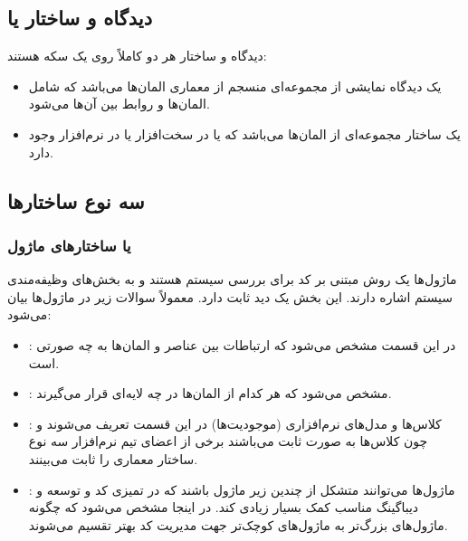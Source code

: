 \subsection{دیدگاه و ساختار یا }

دیدگاه و ساختار هر دو کاملاً روی یک سکه هستند:

\begin{itemize}
    \item یک دیدگاه نمایشی از مجموعه‌ای منسجم از معماری المان‌ها می‌باشد که شامل
    المان‌ها و روابط بین آن‌ها می‌شود.
    \item یک ساختار مجموعه‌ای از المان‌ها می‌باشد که یا در سخت‌افزار یا در
    نرم‌افزار وجود دارد.
\end{itemize}

\subsection{سه نوع ساختار‌ها}

\subsubsection{ یا ساختار‌های ماژول}

ماژول‌ها یک روش مبتنی بر کد برای بررسی سیستم هستند و به بخش‌های وظیفه‌مندی سیستم
اشاره دارند. این بخش یک دید ثابت دارد. معمولاً سوالات زیر در ماژول‌ها بیان
می‌شود:

\begin{itemize}
    \item {}: در این قسمت مشخص می‌شود که ارتباطات بین عناصر و المان‌ها به
    چه صورتی است.
    \item {}: مشخص می‌شود که هر کدام از المان‌ها در چه لایه‌ای قرار
    می‌گیرند.
    \item {}: کلاس‌ها و مدل‌های نرم‌افزاری (موجودیت‌ها) در این قسمت
    تعریف می‌شوند و چون کلاس‌ها به صورت ثابت می‌باشند برخی از اعضای تیم
    نرم‌افزار سه نوع ساختار معماری را ثابت می‌بینند.
    \item {}: ماژول‌ها می‌توانند متشکل از چندین زیر ماژول باشند
    که در تمیزی کد و توسعه و دیباگینگ مناسب کمک بسیار زیادی کند. در اینجا مشخص
    می‌شود که چگونه ماژول‌های بزرگ‌تر به ماژول‌های کوچک‌تر جهت مدیریت کد بهتر
    تقسیم می‌شوند.
\end{itemize}

\subsubsection{}

